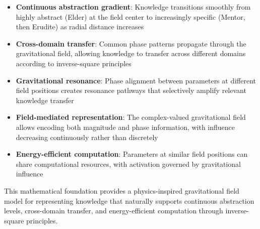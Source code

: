 \begin{itemize}
    \item \textbf{Continuous abstraction gradient}: Knowledge transitions smoothly from highly abstract (Elder) at the field center to increasingly specific (Mentor, then Erudite) as radial distance increases
    
    \item \textbf{Cross-domain transfer}: Common phase patterns propagate through the gravitational field, allowing knowledge to transfer across different domains according to inverse-square principles
    
    \item \textbf{Gravitational resonance}: Phase alignment between parameters at different field positions creates resonance pathways that selectively amplify relevant knowledge transfer
    
    \item \textbf{Field-mediated representation}: The complex-valued gravitational field allows encoding both magnitude and phase information, with influence decreasing continuously rather than discretely
    
    \item \textbf{Energy-efficient computation}: Parameters at similar field positions can share computational resources, with activation governed by gravitational influence
\end{itemize}

This mathematical foundation provides a physics-inspired gravitational field model for representing knowledge that naturally supports continuous abstraction levels, cross-domain transfer, and energy-efficient computation through inverse-square principles.